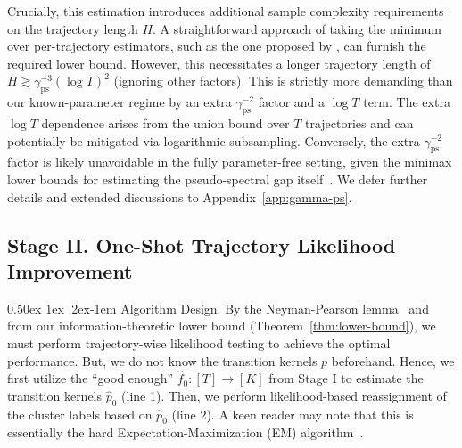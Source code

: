 \documentclass[twoside]{article}
\makeatletter
\renewcommand{\paragraph}{%
  \@startsection{paragraph}{4}%
  {\z@}{0.50ex \@plus 1ex \@minus .2ex}{-1em}%
  {\normalfont\normalsize\bfseries}%
}
\theoremstyle{plain}
\newcommand{\ps}{\mathrm{ps}}
\makeatother
\begin{document}
Crucially, this estimation introduces additional sample complexity requirements on the trajectory length $H$.
A straightforward approach of taking the minimum over per-trajectory estimators, such as the one proposed by \citet[Theorem 1]{wolfer2024mixing}, can furnish the required lower bound.
However, this necessitates a longer trajectory length of $H \gtrsim \gamma_\ps^{-3}(\log T)^2$ (ignoring other factors).
This is strictly more demanding than our known-parameter regime by an extra $\gamma_\ps^{-2}$ factor and a $\log T$ term.
The extra $\log T$ dependence arises from the union bound over $T$ trajectories and can potentially be mitigated via logarithmic subsampling.
Conversely, the extra $\gamma_\ps^{-2}$ factor is likely unavoidable in the fully parameter-free setting, given the minimax lower bounds for estimating the pseudo-spectral gap itself~\citep[Theorem 4]{wolfer2019mixing}.
We defer further details and extended discussions to Appendix~\ref{app:gamma-ps}.






\subsection{Stage II. One-Shot Trajectory Likelihood Improvement}

\paragraph{Algorithm Design.}
By the Neyman-Pearson lemma~\citep{neyman-pearson} and from our information-theoretic lower bound (Theorem~\ref{thm:lower-bound}), we must perform trajectory-wise likelihood testing to achieve the optimal performance.
But, we do not know the transition kernels $p$ beforehand. Hence, we first utilize the ``good enough'' $\widehat{f}_0 : [T] \rightarrow [K]$ from Stage I to estimate the transition kernels $\widehat{p}_0$ (line 1).
Then, we perform likelihood-based reassignment of the cluster labels based on $\widehat{p}_0$ (line 2).
A keen reader may note that this is essentially the hard Expectation-Maximization (EM) algorithm~\citep{celeux1992hardEM,kearns1997hardEM}.
\end{document}
